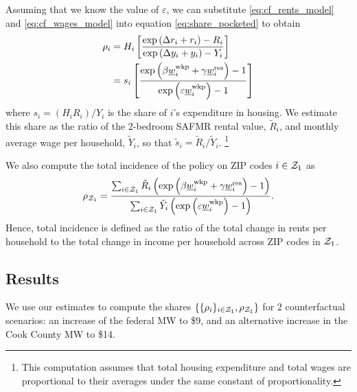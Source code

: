 Assuming that we know the value of $\varepsilon$, we can substitute
\eqref{eq:cf_rents_model} and \eqref{eq:cf_wages_model} into equation
\eqref{eq:share_pocketed} to obtain
\begin{equation}\label{eq:rho}
    \begin{split}
        \rho_i & = H_i \left[ 
        \frac{\exp \left(\Delta r_i + r_i \right) - R_i }
             {\exp \left(\Delta y_i + y_i \right) - Y_i }
        \right] \\
        & = s_i \left[
            \frac{\exp \left( \beta \underline{w}_i^{\text{wkp}} + \gamma \underline{w}_i^{\text{res}} \right) - 1 }
                {\exp \left( \varepsilon \underline{w}_i^{\text{wkp}} \right) - 1 }
            \right]
    \end{split}
\end{equation}
where $s_i = \left(H_i R_i\right)/Y_i$ is the share of $i$'s expenditure in 
housing.
We estimate this share as the ratio of the 2-bedroom SAFMR rental value, 
$\tilde R_i$, and monthly average wage per household, $\tilde Y_i$,
so that $\tilde s_i = \tilde R_i/\tilde Y_i$.%
\footnote{This computation assumes that total housing expenditure and total
wages are proportional to their averages under the same constant of 
proportionality.}

We also compute the total incidence of the policy on ZIP codes $i\in\mathcal{Z}_1$ as
\begin{equation}\label{eq:tot_incidence}
    \rho_{\mathcal{Z}_1} = 
        \frac{\sum_{i\in\mathcal{Z}_1} \tilde R_i \left(\exp \left( \beta \underline{w}_i^{\text{wkp}} 
                                    + \gamma \underline{w}_i^{\text{res}} \right) - 1\right) }
            {\sum_{i\in\mathcal{Z}_1} \tilde Y_i \left( \exp \left( \varepsilon \underline{w}_i^{\text{wkp}} \right) 
                                    - 1\right) } .
\end{equation}
Hence, total incidence is defined as the ratio of the total change in rents
per household to the total change in income per household across ZIP codes 
in $\mathcal{Z}_1$.

\subsection{Results}\label{sec:results_cf}

We use our estimates to compute the shares 
$\{\{\rho_i\}_{i\in\mathcal{Z}_1},\rho_{\mathcal{Z}_1}\}$ for 2 counterfactual scenarios:
an increase of the federal MW to \$9, and an alternative increase in
the Cook County MW to \$14.

